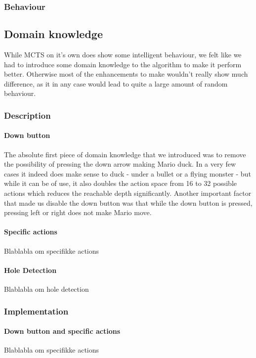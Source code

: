 \documentclass[10pt,a4paper]{article}
\begin{document}
\subsubsection{Behaviour}

\subsection{Domain knowledge}
While MCTS on it's own does show some intelligent behaviour, we felt like we had to introduce some domain knowledge to the algorithm to make it perform better. Otherwise most of the enhancements to make wouldn't really show much difference, as it in any case would lead to quite a large amount of random behaviour.

\subsubsection{Description}
\paragraph{Down button}
The absolute first piece of domain knowledge that we introduced was to remove the possibility of pressing the down arrow making Mario duck. In a very few cases it indeed does make sense to duck - under a bullet or a flying monster - but while it can be of use, it also doubles the action space from 16 to 32 possible actions which reduces the reachable depth significantly.
Another important factor that made us disable the down button was that while the down button is pressed, pressing left or right does not make Mario move.

\paragraph{Specific actions}
Blablabla om specifikke actions

\paragraph{Hole Detection}
Blablabla om hole detection

\subsubsection{Implementation}

\paragraph{Down button and specific actions}
Blablabla om specifikke actions
\end{document}
